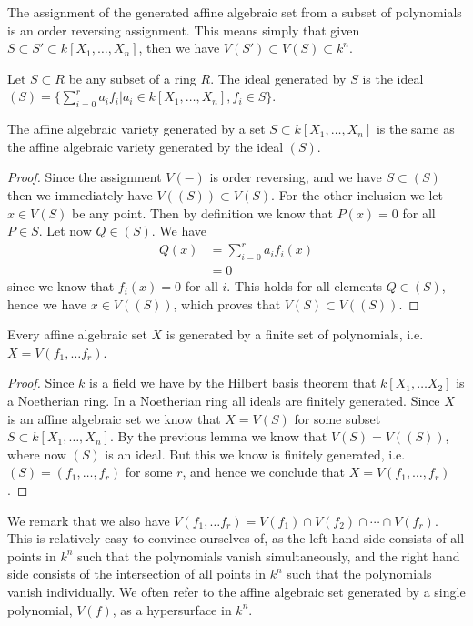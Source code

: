 The assignment of the generated affine algebraic set from a subset of polynomials is an order reversing assignment. This means simply that given $S\subset S' \subset k[X_1, \ldots, X_n]$, then we have $V(S')\subset V(S) \subset k^n$.

\begin{definition}
Let $S\subset R$ be any subset of a ring $R$. The ideal generated by $S$ is the ideal $(S)=\{ \sum_{i=0}^r a_i f_i \vert a_i \in k[X_1, \ldots, X_n], f_i\in S\}$. 
\end{definition}


\begin{lemma}
The affine algebraic variety generated by a set $S\subset k[X_1, \ldots, X_n]$ is the same as the affine algebraic variety generated by the ideal $(S)$.
\end{lemma}
\begin{proof}
Since the assignment $V(-)$ is order reversing, and we have $S\subset (S)$ then we immediately have $V((S))\subset V(S)$. For the other inclusion we let $x\in V(S)$ be any point. Then by definition we know that $P(x)=0$ for all $P\in S$. Let now $Q\in (S)$. We have 
\begin{align*}
    Q(x) 
    &= \sum_{i=0}^r a_i f_i(x) \\
    &= 0
\end{align*}
since we know that $f_i(x) = 0$ for all $i$. This holds for all elements $Q\in (S)$, hence we have $x\in V((S))$, which proves that $V(S)\subset V((S))$. 
\end{proof}

\begin{proposition}
Every affine algebraic set $X$ is generated by a finite set of polynomials, i.e. $X=V(f_1, \ldots f_r)$.
\end{proposition}
\begin{proof}
Since $k$ is a field we have by the Hilbert basis theorem that $k[X_1, \ldots X_2]$ is a Noetherian ring. In a Noetherian ring all ideals are finitely generated. Since $X$ is an affine algebraic set we know that $X=V(S)$ for some subset $S\subset k[X_1, \ldots, X_n]$. By the previous lemma we know that $V(S)=V((S))$, where now $(S)$ is an ideal. But this we know is finitely generated, i.e. $(S) = (f_1, \ldots, f_r)$ for some $r$, and hence we conclude that $X=V(f_1, \ldots, f_r)$. 
\end{proof}

We remark that we also have $V(f_1, \ldots f_r) = V(f_1)\cap V(f_2)\cap \cdots \cap V(f_r)$. This is relatively easy to convince ourselves of, as the left hand side consists of all points in $k^n$ such that the polynomials vanish simultaneously, and the right hand side consists of the intersection of all points in $k^n$ such that the polynomials vanish individually. We often refer to the affine algebraic set generated by a single polynomial, $V(f)$, as a hypersurface in $k^n$. 

